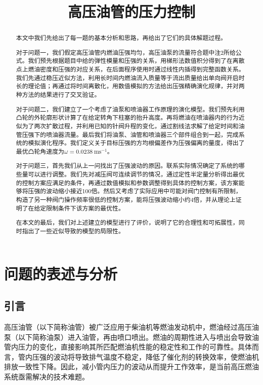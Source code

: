 \documentclass[withoutpreface,bwprint]{cumcmthesis}
\title{高压油管的压力控制}
\newcommand{\vel}{~\mathrm{ms^{-1}}}
\begin{document}
\maketitle
\begin{abstract}
	本文中我们先给出了每一题的基本分析和思路，再给出了它们的具体解题过程。

	对于问题一，我们假定高压油管内燃油压强均匀，高压油泵的流量符合题中注2所给公式。我们预先根据题目中给的弹性模量和压强的关系，用梯形法数值积分得到了在离散点上燃油密度和压强的对应关系，在后面程序使用时通过线性内插得到完整函数关系。我们先通过稳压近似方法，利用长时间内燃油流入质量等于流出质量给出单向阀开启时长的理论值；再通过将时间离散化，用数值模拟的方法给出压强精确演化规律，并对两种方法的结果进行了交叉验证。
	
	对于问题二，我们建立了一个考虑了油泵和喷油器工作原理的演化模型。我们预先利用凸轮的外轮廓形状计算了在给定转角下柱塞的抬升高度。再将燃油在喷油器内的行为近似为了两次扩散过程，并利用已知的针阀升程的变化，通过割线法求解了给定时间和油管压强下的喷油器流量。最后我们将油泵、油管和喷油器三个部件组合到一起，完成系统的模拟演化程序。我们定义关于目标压强的方均根偏差作为压强偏离的量度，得出了最优凸轮角速度为$\omega=0.0238\vel$。
	
	对于问题三，首先我们从上一问找出了压强波动的原因。联系实际情况确定了系统的哪些量可以进行调整。我们先对减压阀可连续调节的情况，通过定性半定量分析得出最优的控制方案应满足的条件，再通过数值模拟和参数调整得到具体的控制方案，该方案能够将压强的波动缩小接近100倍。然后又考虑了实际应用中可能对阀门控制有所限制，构造了另一种阀门操作频率很低的控制方案，能将压强波动缩小约4倍，并从理论上证明了在给定限制条件下该方案的最优性。
	
	在本文的最后，我们对上述建立的模型进行了评价，说明了它的合理性和可拓展性，同时指出了一些近似导致的模型的局限性。
\\
\end{abstract}

\section{问题的表述与分析}
\subsection{引言}

高压油管（以下简称油管）被广泛应用于柴油机等燃油发动机中\cite{引言}，燃油经过高压油泵（以下简称油泵）进入油管，再由喷口喷出。燃油的周期性进入与喷出会导致油管内压力的变化，直接影响其所匹配燃油机性能的稳定性和工作的可靠性。具体而言，管内压强的波动将导致排气温度不稳定，降低了催化剂的转换效率，使燃油机排放一致性下降。因此，减小管内压力的波动从而提升工作效率，是当前高压燃油系统亟需解决的技术难题。
\end{document}
